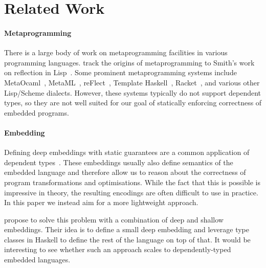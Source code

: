 \documentclass[sigplan,anonymous,review]{acmart}
\begin{document}





\section{\label{sec:related}Related Work}

\paragraph{Metaprogramming} There is a large body of
work on metaprogramming facilities in various programming
languages.  \citet{refl-masses} track the origins
of metaprogramming to Smith's work on reflection in Lisp~\cite{refl-lisp}.
Some prominent metaprogramming systems include
MetaOcaml~\cite{metaocaml}, MetaML~\cite{metaml},
reFlect~\cite{DBLP:journals/jfp/GrundyMO06},
Template Haskell~\cite{sheard2002template},
Racket~\cite{plt-tr1}, and various other Lisp/Scheme dialects.
%
However, these systems typically do not support dependent
types, so they are not well suited for our goal of statically
enforcing correctness of embedded programs.

\paragraph{Embedding}
Defining deep embeddings with static guarantees are a common application
of dependent types~\cite{10.5555/647849.737066,CHAPMAN200921,
10.1007/978-3-540-74464-1_7,10.1145/3236785,10.1145/1863495.1863497}.
%
These embeddings usually also define semantics of the embedded
language and therefore allow us to reason about the correctness
of program transformations and optimisations.
%
While the fact that this is possible is impressive in theory, the resulting
encodings are often difficult to use in practice. In this paper
we instead aim for a more lightweight approach.

\citet{deepshallow} propose to solve this problem with
a combination of deep and shallow embeddings.  Their idea is to define
a small deep embedding and leverage type classes in Haskell to define
the rest of the language on top of that.  It would be interesting to see
whether such an approach scales to dependently-typed embedded
languages.
\end{document}
